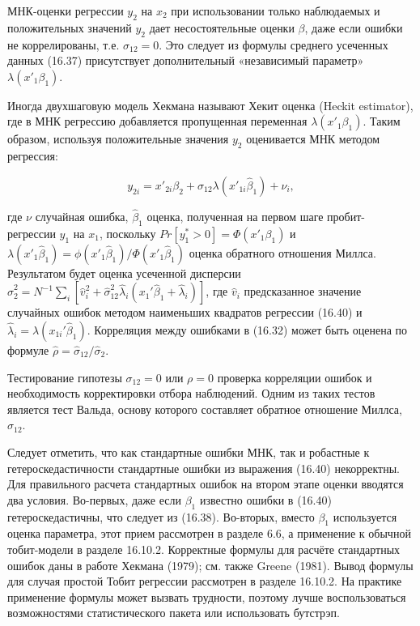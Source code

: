 МНК-оценки регрессии $y_2$ на $x_2$ при использовании только наблюдаемых и положительных значений $y_2$ дает несостоятельные оценки $\beta$, даже если ошибки не коррелированы, т.е. $\sigma_{12}=0$. Это следует из формулы среднего усеченных данных (16.37) присутствует дополнительный «независимый параметр» $\lambda(x'_1\beta_1)$. 

Иногда двухшаговую модель Хекмана называют Хекит оценка (Heckit estimator), где в МНК регрессию добавляется пропущенная переменная $\lambda(x'_1\beta_1)$. Таким образом, используя положительные значения $y_2$ оценивается МНК методом регрессия:

\begin{equation}
y_{2i}={x'}_{2i}\beta_2+\sigma_{12}\lambda({x'}_{1i}\hat{\beta}_1)+\nu_i,
\end{equation}

где $\nu$ случайная ошибка, $\hat{\beta}_1$ оценка, полученная на первом шаге пробит- регрессии $y_1$ на $x_1$, поскольку $Pr[y^{*}_1>0]=\Phi({x'}_1\beta_1)$ и $\lambda({x'}_1\hat{\beta}_1)=\phi({x'}_1\hat{\beta}_1)/{\Phi}({x'}_1\hat{\beta}_1)$ оценка обратного отношения Миллса. Результатом будет оценка усеченной дисперсии $\hat{\sigma}_2^2=N^{-1}\sum_i[\hat{v}_i^2+\hat{\sigma}_{12}^2\hat{\lambda}_i(x_1'\hat{\beta}_1+\hat{\lambda}_i)]$, где $\hat{v}_i$ предсказанное значение случайных ошибок методом наименьших квадратов регрессии (16.40) и $\hat{\lambda}_i=\lambda(x_{1i}'\hat{\beta}_1)$. Корреляция между ошибками в (16.32) может быть оценена по формуле $\hat{\rho}=\hat{\sigma}_{12}/\hat{\sigma}_2.$

Тестирование гипотезы $\sigma_{12}=0$ или $\rho=0$ проверка корреляции ошибок и необходимость корректировки отбора наблюдений. Одним из таких тестов является тест Вальда, основу которого составляет обратное отношение Миллса, $\hat{\sigma}_{12}$. 

Следует отметить, что как стандартные ошибки МНК, так и робастные к гетероскедастичности стандартные ошибки из выражения (16.40) некорректны. Для правильного расчета стандартных ошибок на втором этапе оценки вводятся два условия. Во-первых, даже если $\beta_1$ известно ошибки в (16.40) гетероскедастичны, что следует из (16.38). Во-вторых, вместо $\beta_1$ используется оценка параметра, этот прием рассмотрен в разделе 6.6, а применение к обычной тобит-модели в разделе 16.10.2. Корректные формулы для расчёте стандартных ошибок даны в работе Хекмана (1979); см. также Greene (1981). Вывод формулы для случая простой Тобит регрессии рассмотрен в разделе 16.10.2. На практике применение формулы может вызвать трудности, поэтому лучше воспользоваться возможностями статистического пакета или использовать бутстрэп.

